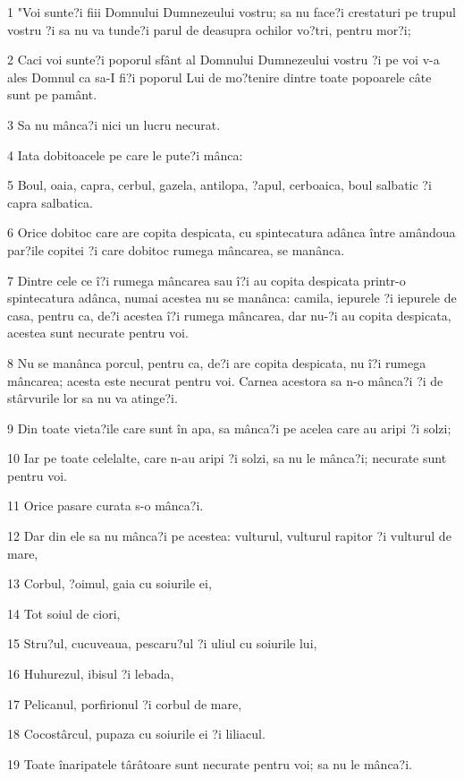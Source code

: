 \par 1 "Voi sunte?i fiii Domnului Dumnezeului vostru; sa nu face?i crestaturi pe trupul vostru ?i sa nu va tunde?i parul de deasupra ochilor vo?tri, pentru mor?i;
\par 2 Caci voi sunte?i poporul sfânt al Domnului Dumnezeului vostru ?i pe voi v-a ales Domnul ca sa-I fi?i poporul Lui de mo?tenire dintre toate popoarele câte sunt pe pamânt.
\par 3 Sa nu mânca?i nici un lucru necurat.
\par 4 Iata dobitoacele pe care le pute?i mânca:
\par 5 Boul, oaia, capra, cerbul, gazela, antilopa, ?apul, cerboaica, boul salbatic ?i capra salbatica.
\par 6 Orice dobitoc care are copita despicata, cu spintecatura adânca între amândoua par?ile copitei ?i care dobitoc rumega mâncarea, se manânca.
\par 7 Dintre cele ce î?i rumega mâncarea sau î?i au copita despicata printr-o spintecatura adânca, numai acestea nu se manânca: camila, iepurele ?i iepurele de casa, pentru ca, de?i acestea î?i rumega mâncarea, dar nu-?i au copita despicata, acestea sunt necurate pentru voi.
\par 8 Nu se manânca porcul, pentru ca, de?i are copita despicata, nu î?i rumega mâncarea; acesta este necurat pentru voi. Carnea acestora sa n-o mânca?i ?i de stârvurile lor sa nu va atinge?i.
\par 9 Din toate vieta?ile care sunt în apa, sa mânca?i pe acelea care au aripi ?i solzi;
\par 10 Iar pe toate celelalte, care n-au aripi ?i solzi, sa nu le mânca?i; necurate sunt pentru voi.
\par 11 Orice pasare curata s-o mânca?i.
\par 12 Dar din ele sa nu mânca?i pe acestea: vulturul, vulturul rapitor ?i vulturul de mare,
\par 13 Corbul, ?oimul, gaia cu soiurile ei,
\par 14 Tot soiul de ciori,
\par 15 Stru?ul, cucuveaua, pescaru?ul ?i uliul cu soiurile lui,
\par 16 Huhurezul, ibisul ?i lebada,
\par 17 Pelicanul, porfirionul ?i corbul de mare,
\par 18 Cocostârcul, pupaza cu soiurile ei ?i liliacul.
\par 19 Toate înaripatele târâtoare sunt necurate pentru voi; sa nu le mânca?i.
